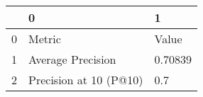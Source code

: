 \begin{tabular}{lll}
\toprule
{} &                       0 &        1 \\
\midrule
0 &                  Metric &    Value \\
1 &       Average Precision &  0.70839 \\
2 &  Precision at 10 (P@10) &      0.7 \\
\bottomrule
\end{tabular}
